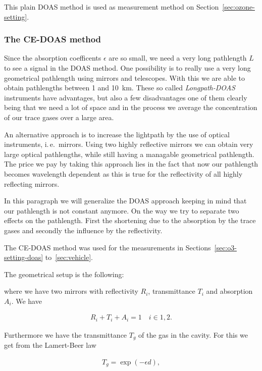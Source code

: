 This plain DOAS method is used as measurement method on
Section~\ref{sec:ozone-setting}. 

\subsubsection{The CE-DOAS method}
\label{sec:ce-doas}

Since the absorption coefficents $\epsilon$ are so small, we need a
very long pathlength $L$ to see a signal in the DOAS method. One
possibility is to really use a very long geometrical pathlength using
mirrors and telescopes. With this we are able to obtain pathlengths
between \num{1} and \SI{10}{\kilo\meter}. These so called
\emph{Longpath-DOAS} instruments have advantages, but also a few
disadvantages one of them clearly being that we need a lot of space
and in the process we average the concentration of our trace gases
over a large area.

An alternative approach is to increase the lightpath by the use of
optical instruments, i.\,e.\ mirrors. Using two highly reflective
mirrors we can obtain very large optical pathlengths, while still
having a managable geometrical pathlength. The price we pay by taking
this approach lies in the fact that now our pathlength becomes
wavelength dependent as this is true for the reflectivity of all
highly reflecting mirrors. 

In this paragraph we will generalize the DOAS approach keeping in mind
that our pathlength is not constant anymore. On the way we try to
separate two effects on the pathlength. First the shortening due to
the absorption by the trace gases and secondly the influence by the
reflectivity.

The CE-DOAS method was used for the measurements in
Sections~\ref{sec:o3-setting-doas} to~\ref{sec:vehicle}. 

The geometrical setup is the following:

where we have two mirrors with reflectivity $R_i$, transmittance $T_i$
and absorption $A_i$. We have

\begin{align*}
  R_i + T_i + A_i = 1 \quad i \in{1,2}.
\end{align*}

Furthermore we have the transmittance $T_g$ of the gas in the
cavity. For this we get from the Lamert-Beer law

\begin{align*}
  T_g = \exp(-\epsilon d),
\end{align*}


